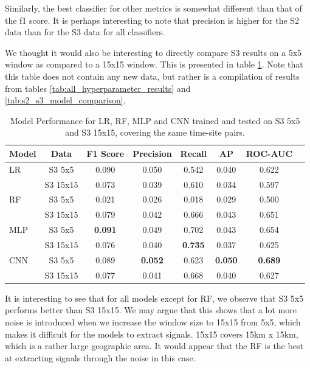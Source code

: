 \documentclass[a4paper,11pt]{report}
\begin{document}
Similarly, the best classifier for other metrics is somewhat different than that of the f1 score. It is perhaps interesting to note that precision is higher for the S2 data than for the S3 data for all classifiers. 

We thought it would also be interesting to directly compare S3 results on a 5x5 window as compared to a 15x15 window. This is presented in table \ref{tab:s3_5v15_model_comparison}. Note that this table does not contain any new data, but rather is a compilation of results from tables \ref{tab:all_hyperparameter_results} and \ref{tab:s2_s3_model_comparison}. 

    \begin{table}[h]
        \caption{Model Performance for LR, RF, MLP and CNN trained and tested on S3 5x5 and S3 15x15, covering the same time-site pairs.}
        \label{tab:s3_5v15_model_comparison}
        \centering
        \begin{tabular}{lccccccc}
        \toprule
        \textbf{Model} & \textbf{Data} & \textbf{F1 Score} & \textbf{Precision} & \textbf{Recall} & \textbf{AP} & \textbf{ROC-AUC} \\ \midrule
        LR & S3 5x5 & 0.090 & 0.050 & 0.542 & 0.040 & 0.622   \\ 
         & S3 15x15 & 0.073 & 0.039 & 0.610 & 0.034 & 0.597 \\ \midrule
        RF & S3 5x5 & 0.021 & 0.026 & 0.018 & 0.029 & 0.500 \\
         & S3 15x15 & 0.079 & 0.042 & 0.666 & 0.043 & 0.651  \\ \midrule
        MLP & S3 5x5 & \textbf{0.091} & 0.049 & 0.702 & 0.043 & 0.654   \\
         & S3 15x15 & 0.076 & 0.040 & \textbf{0.735} & 0.037 & 0.625  \\ \midrule
        CNN & S3 5x5 & 0.089 & \textbf{0.052} & 0.623 & \textbf{0.050} & \textbf{0.689}    \\ 
         & S3 15x15 & 0.077 & 0.041 & 0.668 & 0.040 & 0.627  \\ \bottomrule
        \end{tabular}
    \end{table}

It is interesting to see that for all models except for RF, we observe that S3 5x5 performs better than S3 15x15. We may argue that this shows that a lot more noise is introduced when we increase the window size to 15x15 from 5x5, which makes it difficult for the models to extract signals. 15x15 covers 15km x 15km, which is a rather large geographic area. It would appear that the RF is the best at extracting signals through the noise in this case. 
\end{document}
